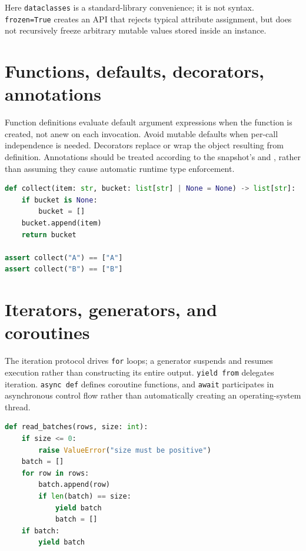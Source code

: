 \documentclass[
  11pt,
]{report}
\newcommand{\passthrough}[1]{#1}
\begin{document}
Here \passthrough{\lstinline!dataclasses!} is a standard-library
convenience; it is not syntax. \passthrough{\lstinline!frozen=True!}
creates an API that rejects typical attribute assignment, but does not
recursively freeze arbitrary mutable values stored inside an instance.

\section{Functions, defaults, decorators,
annotations}\label{functions-defaults-decorators-annotations}

Function definitions evaluate default argument expressions when the
function is created, not anew on each invocation. Avoid mutable defaults
when per-call independence is needed. Decorators replace or wrap the
object resulting from definition. Annotations should be treated
according to the snapshot's  and
, rather than
assuming they cause automatic runtime type enforcement.

\begin{lstlisting}[language=Python]
def collect(item: str, bucket: list[str] | None = None) -> list[str]:
    if bucket is None:
        bucket = []
    bucket.append(item)
    return bucket

assert collect("A") == ["A"]
assert collect("B") == ["B"]
\end{lstlisting}

\section{Iterators, generators, and
coroutines}\label{iterators-generators-and-coroutines}

The iteration protocol drives \passthrough{\lstinline!for!} loops; a
generator suspends and resumes execution rather than constructing its
entire output. \passthrough{\lstinline!yield from!} delegates iteration.
\passthrough{\lstinline!async def!} defines coroutine functions, and
\passthrough{\lstinline!await!} participates in asynchronous control
flow rather than automatically creating an operating-system thread.

\begin{lstlisting}[language=Python]
def read_batches(rows, size: int):
    if size <= 0:
        raise ValueError("size must be positive")
    batch = []
    for row in rows:
        batch.append(row)
        if len(batch) == size:
            yield batch
            batch = []
    if batch:
        yield batch
\end{lstlisting}
\end{document}
